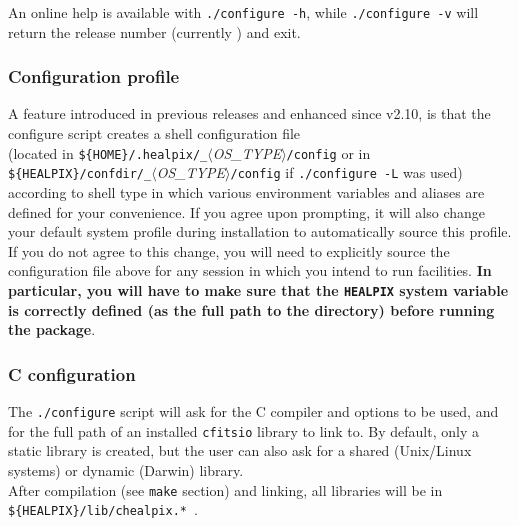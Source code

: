 \documentclass[12pt,twoside]{article}
\begin{document}
An online help is available with 
\texttt{./configure~-h}, while 
\texttt{./configure~-v} 
will return the \healpix release number (currently \hpxversion) and exit.

\subsubsection{Configuration profile}
\label{subsub:conf}
A feature introduced in previous releases and enhanced since v2.10, is that 
the configure script creates a shell configuration file \hfill\\
(located in
\texttt{\$\{HOME\}/.healpix/\hpxverstex\_}{\em $\langle$OS\_TYPE$\rangle$}\texttt{/config}
or in
\hfill\\
\texttt{\$\{HEALPIX\}/confdir/\hpxverstex\_}{\em $\langle$OS\_TYPE$\rangle$}\texttt{/config}
if \texttt{./configure -L} was used)
according to shell
type in which various environment variables and aliases are defined
for your convenience. If you agree upon prompting, it will also
change your default system profile during installation to
automatically source this profile. If you do not agree to this change,
you will need to explicitly source the configuration file above for any session in
which you intend to run \healpix facilities. {\bf In particular, you will
have to make sure that the \texttt{HEALPIX} system variable is correctly
defined (as the full path to the \healpix directory) before running
the package}.


\subsubsection{C configuration}

The \texttt{./configure} script will ask for the C compiler and options to
be used, and for the full path of an installed \texttt{cfitsio} library to link to.
By default, only a static library is created, but the user can also ask for
 a shared (Unix/Linux systems) or dynamic (Darwin) library. \\
After compilation
(see \texttt{make} section) and linking, all libraries will be 
in \texttt{\$\{HEALPIX\}/lib/chealpix.*}\ .
\end{document}
